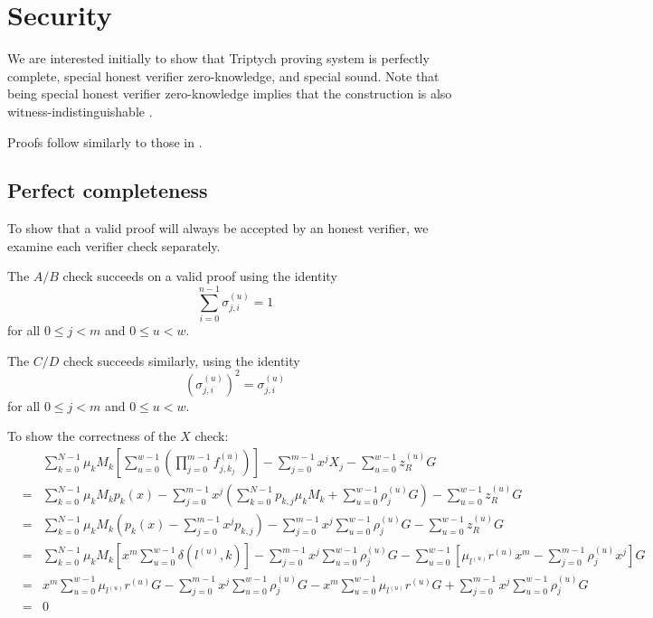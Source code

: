 \documentclass[draft]{article} %
\newcommand{\sumi}{\sum_{i=0}^{n-1}}
\newcommand{\sumj}{\sum_{j=0}^{m-1}}
\newcommand{\sumk}{\sum_{k=0}^{N-1}}
\newcommand{\sumu}{\sum_{u=0}^{w-1}}
\begin{document}
\section{Security}
We are interested initially to show that Triptych proving system is perfectly complete, special honest verifier zero-knowledge, and special sound.
Note that being special honest verifier zero-knowledge implies that the construction is also witness-indistinguishable \cite{cramer}.

Proofs follow similarly to those in \cite{bootle}.


\subsection{Perfect completeness}
To show that a valid proof will always be accepted by an honest verifier, we examine each verifier check separately.

The $A/B$ check succeeds on a valid proof using the identity $$\sumi \sigma^{(u)}_{j,i} = 1$$ for all $0 \leq j < m$ and $0 \leq u < w$.

The $C/D$ check succeeds similarly, using the identity $$\left(\sigma^{(u)}_{j,i}\right)^2 = \sigma^{(u)}_{j,i}$$ for all $0 \leq j < m$ and $0 \leq u < w$.

To show the correctness of the $X$ check:
\begin{eqnarray*}
&& \sumk \mu_kM_k \left[ \sumu \left( \prod_{j=0}^{m-1} f^{(u)}_{j,k_j} \right) \right] - \sumj x^jX_j - \sumu z^{(u)}_RG \\
&=& \sumk \mu_kM_k p_k(x) - \sumj x^j \left( \sumk p_{k,j}\mu_kM_k + \sumu \rho^{(u)}_jG \right) - \sumu z^{(u)}_RG \\
&=& \sumk \mu_kM_k \left( p_k(x) - \sumj x^j p_{k,j} \right) - \sumj x^j \sumu \rho^{(u)}_jG - \sumu z^{(u)}_RG \\
&=& \sumk \mu_kM_k \left[ x^m \sumu \delta\left( l^{(u)},k \right) \right] - \sumj x^j \sumu \rho^{(u)}_jG - \sumu\left[ \mu_{l^{(u)}}r^{(u)}x^m - \sumj \rho^{(u)}_jx^j \right]G \\
&=& x^m\sumu \mu_{l^{(u)}}r^{(u)}G - \sumj x^j \sumu \rho^{(u)}_jG - x^m\sumu \mu_{l^{(u)}}r^{(u)}G + \sumj x^j \sumu \rho^{(u)}_jG \\
&=& 0
\end{eqnarray*}
\end{document}
